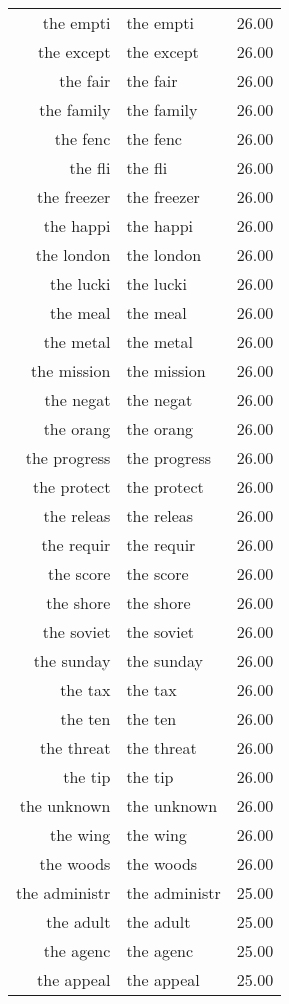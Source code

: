 \begin{table}[ht]
\begin{tabular}{rlr}
  the empti & the empti & 26.00 \\ 
  the except & the except & 26.00 \\ 
  the fair & the fair & 26.00 \\ 
  the family & the family & 26.00 \\ 
  the fenc & the fenc & 26.00 \\ 
  the fli & the fli & 26.00 \\ 
  the freezer & the freezer & 26.00 \\ 
  the happi & the happi & 26.00 \\ 
  the london & the london & 26.00 \\ 
  the lucki & the lucki & 26.00 \\ 
  the meal & the meal & 26.00 \\ 
  the metal & the metal & 26.00 \\ 
  the mission & the mission & 26.00 \\ 
  the negat & the negat & 26.00 \\ 
  the orang & the orang & 26.00 \\ 
  the progress & the progress & 26.00 \\ 
  the protect & the protect & 26.00 \\ 
  the releas & the releas & 26.00 \\ 
  the requir & the requir & 26.00 \\ 
  the score & the score & 26.00 \\ 
  the shore & the shore & 26.00 \\ 
  the soviet & the soviet & 26.00 \\ 
  the sunday & the sunday & 26.00 \\ 
  the tax & the tax & 26.00 \\ 
  the ten & the ten & 26.00 \\ 
  the threat & the threat & 26.00 \\ 
  the tip & the tip & 26.00 \\ 
  the unknown & the unknown & 26.00 \\ 
  the wing & the wing & 26.00 \\ 
  the woods & the woods & 26.00 \\ 
  the administr & the administr & 25.00 \\ 
  the adult & the adult & 25.00 \\ 
  the agenc & the agenc & 25.00 \\ 
  the appeal & the appeal & 25.00 \\ 

\end{tabular}
\end{table}
